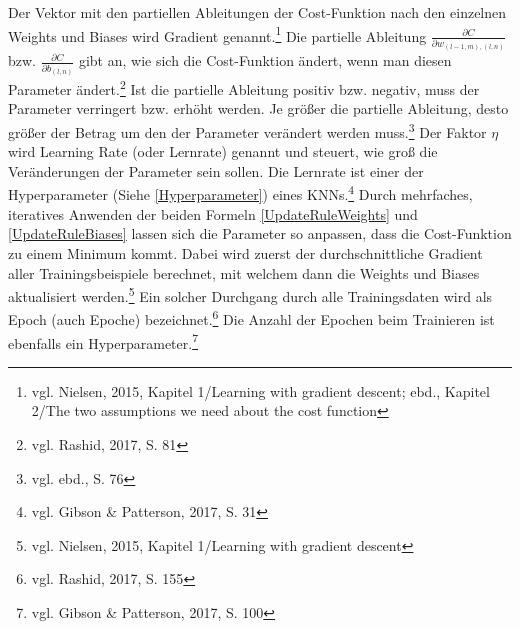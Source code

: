 \documentclass[a4paper,12pt,ngerman,oneside]{scrreprt}	%
\newcommand{\practitioner}[1]{vgl. Gibson \& Patterson, 2017, S. {#1}}
\begin{document}
			Der Vektor mit den partiellen Ableitungen der Cost-Funktion nach den einzelnen Weights und Biases wird Gradient genannt.\footnote{vgl. Nielsen, 2015, Kapitel 1/Learning with gradient descent; ebd., Kapitel 2/The two assumptions we need about the cost function} Die partielle Ableitung $\frac{\partial C}{\partial w_{(l-1,m),(l,n)}}$ bzw. $\frac{\partial C}{\partial b_{(l,n)}}$ gibt an, wie sich die Cost-Funktion ändert, wenn man diesen Parameter ändert.\footnote{vgl. Rashid, 2017, S. 81} Ist die partielle Ableitung positiv bzw. negativ, muss der Parameter verringert bzw. erhöht werden. Je größer die partielle Ableitung, desto größer der Betrag um den der Parameter verändert werden muss.\footnote{vgl. ebd., S. 76} Der Faktor $\eta$ wird Learning Rate (oder Lernrate) genannt und steuert, wie groß die Veränderungen der Parameter sein sollen. Die Lernrate ist einer der Hyperparameter (Siehe \ref{Hyperparameter}) eines KNNs.\footnote{\practitioner{31}} \newline \break %
			Durch mehrfaches, iteratives Anwenden der beiden Formeln \ref{UpdateRuleWeights} und \ref{UpdateRuleBiases} lassen sich die Parameter so anpassen, dass die Cost-Funktion zu einem Minimum kommt. Dabei wird zuerst der durchschnittliche Gradient aller Trainingsbeispiele berechnet, mit welchem dann die Weights und Biases aktualisiert werden.\footnote{vgl. Nielsen, 2015, Kapitel 1/Learning with gradient descent} Ein solcher Durchgang durch alle Trainingsdaten wird als Epoch (auch Epoche) bezeichnet.\footnote{vgl. Rashid, 2017, S. 155} Die Anzahl der Epochen beim Trainieren ist ebenfalls ein Hyperparameter.\footnote{\practitioner{100}}
			\enlargethispage{0.3\baselineskip}
			
\end{document}
